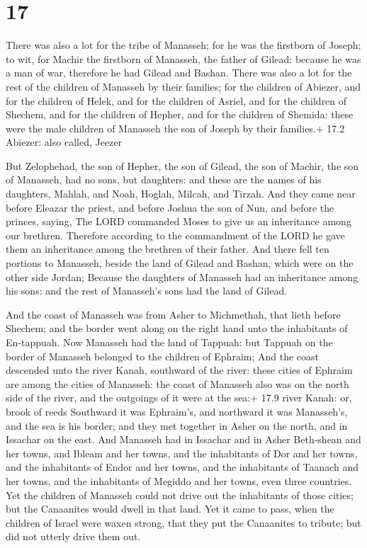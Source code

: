 \hypertarget{section-16}{%
\section{17}\label{section-16}}

 There was also a lot for the tribe of Manasseh; for he was
the firstborn of Joseph; to wit, for Machir the firstborn of Manasseh,
the father of Gilead: because he was a man of war, therefore he had
Gilead and Bashan.  There was also a lot for the rest of the
children of Manasseh by their families; for the children of Abiezer, and
for the children of Helek, and for the children of Asriel, and for the
children of Shechem, and for the children of Hepher, and for the
children of Shemida: these were the male children of Manasseh the son of
Joseph by their families.+ 17.2 Abiezer: also called, Jeezer

 But Zelophehad, the son of Hepher, the son of Gilead, the
son of Machir, the son of Manasseh, had no sons, but daughters: and
these are the names of his daughters, Mahlah, and Noah, Hoglah, Milcah,
and Tirzah.  And they came near before Eleazar the priest,
and before Joshua the son of Nun, and before the princes, saying, The
LORD commanded Moses to give us an inheritance among our brethren.
Therefore according to the commandment of the LORD he gave them an
inheritance among the brethren of their father.  And there
fell ten portions to Manasseh, beside the land of Gilead and Bashan,
which were on the other side Jordan;  Because the daughters
of Manasseh had an inheritance among his sons: and the rest of
Manasseh's sons had the land of Gilead.

 And the coast of Manasseh was from Asher to Michmethah,
that lieth before Shechem; and the border went along on the right hand
unto the inhabitants of En-tappuah.  Now Manasseh had the
land of Tappuah: but Tappuah on the border of Manasseh belonged to the
children of Ephraim;  And the coast descended unto the river
Kanah, southward of the river: these cities of Ephraim are among the
cities of Manasseh: the coast of Manasseh also was on the north side of
the river, and the outgoings of it were at the sea:+ 17.9 river Kanah:
or, brook of reeds  Southward it was Ephraim's, and
northward it was Manasseh's, and the sea is his border; and they met
together in Asher on the north, and in Issachar on the east.
 And Manasseh had in Issachar and in Asher Beth-shean and
her towns, and Ibleam and her towns, and the inhabitants of Dor and her
towns, and the inhabitants of Endor and her towns, and the inhabitants
of Taanach and her towns, and the inhabitants of Megiddo and her towns,
even three countries.  Yet the children of Manasseh could
not drive out the inhabitants of those cities; but the Canaanites would
dwell in that land.  Yet it came to pass, when the children
of Israel were waxen strong, that they put the Canaanites to tribute;
but did not utterly drive them out.


